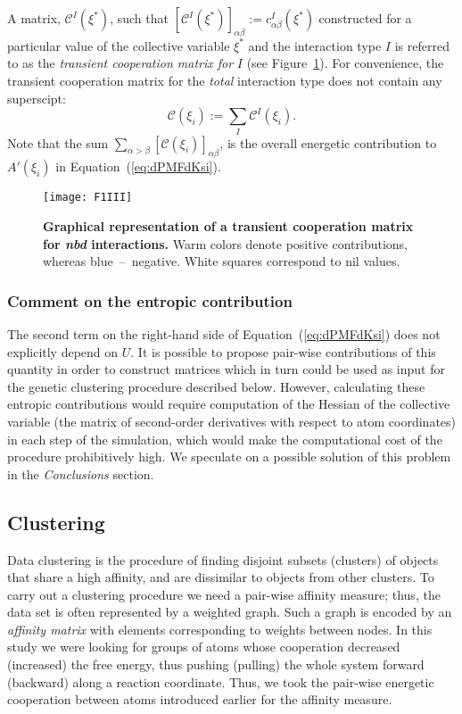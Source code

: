 A matrix, $\mathcal{C}^{I}(\xi^*)$, such that $[\mathcal{C}^I(\xi^*)]_{\alpha\beta}:=c^I_{\alpha\beta}(\xi^*)$ constructed for a particular value of the collective variable $\xi^*$ and the interaction type $I$ is referred to as the \emph{transient cooperation matrix for} $I$ {\color{black}(see Figure~\ref{fig:numberedMatrix})}.
For convenience, the transient cooperation matrix for the \emph{total} interaction type does not contain any superscipt: $$\mathcal{C}(\xi_i):=\sum_I\mathcal{C}^I(\xi_i).$$
Note that the sum $\sum_{\alpha>\beta}[\mathcal{C}(\xi_i)]_{\alpha\beta}$, is the overall energetic contribution to $A'(\xi_i)$ in Equation~(\ref{eq:dPMFdKsi}).

\begin{figure}[H]
\centering
\texttt{[image: F1III]}
\caption{
{\bf Graphical representation of a transient cooperation matrix for \emph{nbd} interactions.}
Warm colors denote positive contributions, whereas blue~--~negative.
White squares correspond to {\color{black}nil values}.
}
\label{fig:numberedMatrix}
\end{figure}

\subsubsection*{Comment on the entropic contribution} 
The second term on the right-hand side of Equation~(\ref{eq:dPMFdKsi}) does not explicitly depend on $U$.
It is possible to propose pair-wise contributions of this quantity in order to construct matrices which in turn could be used as input for the genetic clustering procedure described below.
{\color{black}However, calculating these entropic contributions would require computation of the Hessian of the collective variable (the matrix of second-order derivatives with respect to atom coordinates) in each step of the simulation, which would make the computational cost of the procedure prohibitively high.}
{\color{black}We speculate on a possible solution of this problem in the \emph{Conclusions} section.}

\subsection*{Clustering}
Data clustering is the procedure of finding disjoint subsets (clusters) of objects that share a high affinity, and are dissimilar to objects from other clusters.
To carry out a clustering procedure we need a pair-wise affinity measure; thus, the data set is often represented by a weighted graph.
Such {\color{black}a} graph is encoded by an \emph{affinity matrix} with elements corresponding to weights between nodes.
In this study we were looking for groups of atoms whose cooperation decreased (increased) the free energy, thus pushing (pulling) the whole system forward (backward) along a reaction coordinate.
Thus, we took the pair-wise energetic cooperation between atoms introduced earlier for the affinity measure. 

